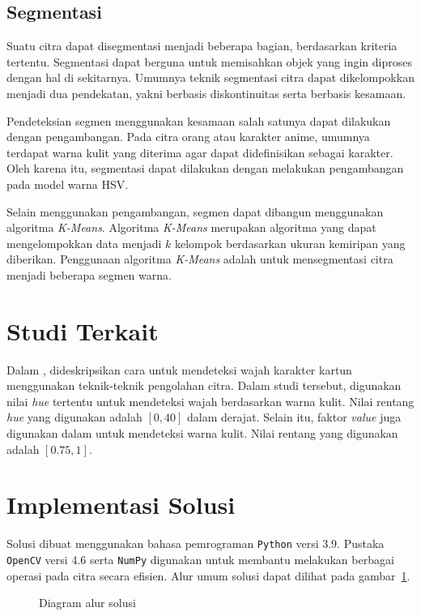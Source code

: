 \documentclass[conference, a4paper]{IEEEtran}
\begin{document}
\subsection{Segmentasi}
Suatu citra dapat disegmentasi menjadi beberapa bagian, berdasarkan kriteria tertentu. Segmentasi dapat berguna untuk memisahkan objek yang ingin diproses dengan hal di sekitarnya. Umumnya teknik segmentasi citra dapat dikelompokkan menjadi dua pendekatan, yakni berbasis diskontinuitas serta berbasis kesamaan.

Pendeteksian segmen menggunakan kesamaan salah satunya dapat dilakukan dengan pengambangan. Pada citra orang atau karakter anime, umumnya terdapat warna kulit yang diterima agar dapat didefinisikan sebagai karakter. Oleh karena itu, segmentasi dapat dilakukan dengan melakukan pengambangan pada model warna HSV.

Selain menggunakan pengambangan, segmen dapat dibangun menggunakan algoritma \textit{K-Means}. Algoritma \textit{K-Means} merupakan algoritma yang dapat mengelompokkan data menjadi $k$ kelompok berdasarkan ukuran kemiripan yang diberikan. Penggunaan algoritma \textit{K-Means} adalah untuk mensegmentasi citra menjadi beberapa segmen warna.

\section{Studi Terkait}
Dalam \cite{takayama2012face}, dideskripsikan cara untuk mendeteksi wajah karakter kartun menggunakan teknik-teknik pengolahan citra. Dalam studi tersebut, digunakan nilai \textit{hue} tertentu untuk mendeteksi wajah berdasarkan warna kulit. Nilai rentang \textit{hue} yang digunakan adalah $[0, 40]$ dalam derajat. Selain itu, faktor \textit{value} juga digunakan dalam untuk mendeteksi warna kulit. Nilai rentang yang digunakan adalah $[0.75, 1]$.

\section{Implementasi Solusi}
Solusi dibuat menggunakan bahasa pemrograman \texttt{Python} versi 3.9. Pustaka \texttt{OpenCV} versi 4.6 serta \texttt{NumPy} digunakan untuk membantu melakukan berbagai operasi pada citra secara efisien. Alur umum solusi dapat dilihat pada gambar~\ref{sol}.

\begin{figure}[ht]
  
  \caption{Diagram alur solusi}\label{sol}
\end{figure}
\end{document}
